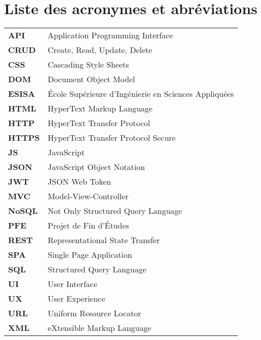 \chapter*{Liste des acronymes et abréviations}

\begin{tabular}{ll}
\textbf{API} & Application Programming Interface \\
\textbf{CRUD} & Create, Read, Update, Delete \\
\textbf{CSS} & Cascading Style Sheets \\
\textbf{DOM} & Document Object Model \\
\textbf{ESISA} & École Supérieure d'Ingénierie en Sciences Appliquées \\
\textbf{HTML} & HyperText Markup Language \\
\textbf{HTTP} & HyperText Transfer Protocol \\
\textbf{HTTPS} & HyperText Transfer Protocol Secure \\
\textbf{JS} & JavaScript \\
\textbf{JSON} & JavaScript Object Notation \\
\textbf{JWT} & JSON Web Token \\
\textbf{MVC} & Model-View-Controller \\
\textbf{NoSQL} & Not Only Structured Query Language \\
\textbf{PFE} & Projet de Fin d'Études \\
\textbf{REST} & Representational State Transfer \\
\textbf{SPA} & Single Page Application \\
\textbf{SQL} & Structured Query Language \\
\textbf{UI} & User Interface \\
\textbf{UX} & User Experience \\
\textbf{URL} & Uniform Resource Locator \\
\textbf{XML} & eXtensible Markup Language \\
\end{tabular}

